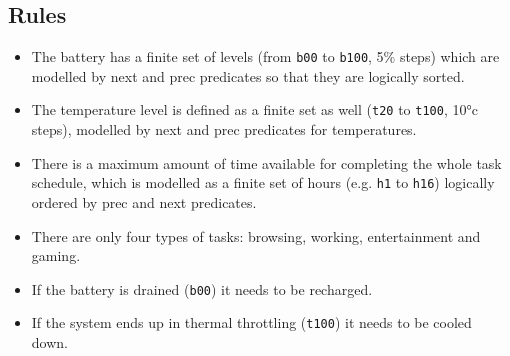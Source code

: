 \documentclass[12pt]{article}
\begin{document}
\subsection{Rules}
\begin{itemize}
    \item The battery has a finite set of levels (from \verb|b00| to \verb|b100|, 5\% steps) which are modelled by next and prec predicates so that they are logically sorted.
    \item The temperature level is defined as a finite set as well (\verb|t20| to \verb|t100|, 10°c steps), modelled by next and prec predicates for temperatures.
    \item There is a maximum amount of time available for completing the whole task schedule, which is modelled as a finite set of hours (e.g. \verb|h1| to \verb|h16|) logically ordered by prec and next predicates.
    \item There are only four types of tasks: browsing, working, entertainment and gaming.
    \item If the battery is drained (\verb|b00|) it needs to be recharged.
    \item If the system ends up in thermal throttling (\verb|t100|) it needs to be cooled down.
\end{itemize}
\end{document}
